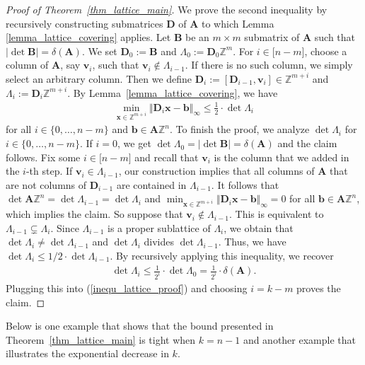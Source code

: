 \documentclass[pdflatex]{sn-jnl}
\newcommand{\Z}{\mathbb{Z}}
\newcommand{\bA}{\bm{A}}
\newcommand{\bx}{\bm{x}}
\newcommand{\bb}{\bm{b}}
\newcommand{\bv}{\bm{v}}
\newcommand{\bB}{\bm{B}}
\newcommand{\bD}{\bm{D}}
\theoremstyle{thmstyleone}%
\theoremstyle{thmstyletwo}%
\theoremstyle{thmstylethree}%
\begin{document}
	\begin{proof}[Proof of Theorem~\ref{thm_lattice_main}]
		We prove the second inequality by recursively constructing submatrices $\bD$ of $\bA$ to which Lemma \ref{lemma_lattice_covering} applies. Let $\bB$ be an $m\times m$ submatrix of $\bA$ such that $\left|\det\bB\right| = \delta(\bA)$. We set $\bD_0 := \bB$ and $\Lambda_0 := \bD_0\Z^m$. For $i\in \lbrack n - m\rbrack$, choose a column of $\bA$, say $\bv_i$, such that $\bv_i\notin \Lambda_{i-1}$. If there is no such column, we simply select an arbitrary column. Then we define $\bD_i := [\bD_{i-1},\bv_i]\in\Z^{m + i}$ and $\Lambda_i :=\bD_i\Z^{m + i}$. By Lemma~\ref{lemma_lattice_covering}, we have 
		\begin{align}
			\label{inequ_lattice_proof}
			\min_{\bx\in\Z^{m + i}}\Vert \bD_i\bx - \bb\Vert_\infty\leq \frac{1}{2}\cdot\det\Lambda_i	
		\end{align}
		for all $i\in\lbrace 0,\ldots,n - m\rbrace$ and $\bb \in \bA\Z^n$. To finish the proof, we analyze $\det\Lambda_i$ for $i\in\lbrace 0,\ldots,n-m\rbrace$. If $i=0$, we get $\det\Lambda_0 = \left|\det\bB\right| = \delta(\bA)$ and the claim follows. Fix some $i\in\lbrack n-m\rbrack$ and recall that $\bv_i$ is the column that we added in the $i$-th step. If $\bv_i\in \Lambda_{i-1}$, our construction implies that all columns of $\bA$ that are not columns of $\bD_{i-1}$ are contained in $\Lambda_{i-1}$. It follows that $\det\bA\Z^n = \det\Lambda_{i-1} = \det\Lambda_i$ and $\min_{\bx\in\Z^{m + i}}\Vert \bD_i\bx - \bb\Vert_\infty = 0$ for all $\bb\in\bA\Z^n$, which implies the claim. So suppose that $\bv_i\notin\Lambda_{i-1}$. This is equivalent to $\Lambda_{i-1}\subsetneq \Lambda_i$. Since $\Lambda_{i-1}$ is a proper sublattice of $\Lambda_i$, we obtain that $\det\Lambda_i \neq \det\Lambda_{i-1}$ and $\det\Lambda_i$ divides $\det\Lambda_{i-1}$. Thus, we have $\det\Lambda_i\leq 1/2\cdot\det\Lambda_{i-1}$. By recursively applying this inequality, we recover 
		\begin{align*}
			\det\Lambda_i \leq \frac{1}{2^i}\cdot\det\Lambda_0 = \frac{1}{2^i}\cdot\delta(\bA).
		\end{align*}
		Plugging this into (\ref{inequ_lattice_proof}) and choosing $i = k - m$ proves the claim. 
	\end{proof}
	
	Below is one example that shows that the bound presented in Theorem~\ref{thm_lattice_main} is tight when $k = n - 1$ and another example that illustrates the exponential decrease in $k$.
	
\end{document}
